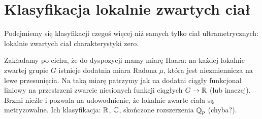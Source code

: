 \section{Klasyfikacja lokalnie zwartych ciał}
Podejmiemy  się klasyfikacji czegoś więcej niż samych tylko ciał ultrametrycznych: lokalnie zwartych ciał charakterystyki zero.

Zakładamy po cichu, że do dyspozycji mamy miarę Haara: na każdej lokalnie zwartej grupie $G$ istnieje dodatnia miara Radona $\mu$, która jest niezmiennicza na lewe przesunięcia.
Na taką miarę patrzymy jak na dodatni ciągły funkcjonał liniowy na przestrzeni zwarcie niesionych funkcji ciągłych $G \to \mathbb R$ (lub inaczej).
Brzmi nieźle i pozwala na udowodnienie, że lokalnie zwarte ciała są metryzowalne.
Ich klasyfikacja: $\mathbb R$, $\mathbb C$, skończone rozszerzenia $\mathbb Q_p$ (chyba?).
